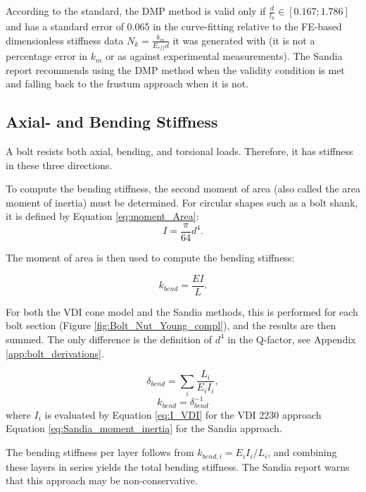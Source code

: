 \documentclass[a4paper,twoside]{bth}
\begin{document}
According to the standard, the DMP method is valid only if $\tfrac{d}{l_k} \in [0.167; 1.786]$ and has a standard error of 0.065 in the curve-fitting relative to the FE-based dimensionless stiffness data $N_k = \tfrac{k_m}{E_{eff}d}$ it was generated with (it is not a percentage error in $k_m$ or as against experimental measurements). The Sandia report recommends using the DMP method when the validity condition is met and falling back to the frustum approach when it is not.

\subsection{Axial- and Bending Stiffness}
A bolt resists both axial, bending, and torsional loads. Therefore, it has stiffness in these three directions.

To compute the bending stiffness, the second moment of area (also called the area moment of inertia) must be determined. For circular shapes such as a bolt shank, it is defined by Equation \ref{eq:moment_Area}:
\begin{equation} \label{eq:moment_Area}
    I = \frac{\pi}{64} d^4.
\end{equation}

The moment of area is then used to compute the bending stiffness:

\begin{equation}
    k_{bend} = \frac{EI}{L}.
\end{equation}

For both the VDI cone model and the Sandia methods, this is performed for each bolt section (Figure \ref{fig:Bolt_Nut_Young_compl}), and the results are then summed. The only difference is the definition of $d^4$ in the Q-factor, see Appendix \ref{app:bolt_derivations}.

\begin{equation}
    \delta_{bend} = \sum_i \frac{L_i}{E_i I_i},
\end{equation}
\begin{equation}
    k_{bend} = \delta_{bend}^{-1}
\end{equation}
where $I_i$ is evaluated by Equation \ref{eq:I_VDI} for the VDI 2230 approach Equation \ref{eq:Sandia_moment_inertia} for the Sandia approach.

The bending stiffness per layer follows from $k_{bend, i} = E_iI_i/L_i$, and combining these layers in series yields the total bending stiffness. The Sandia report warns that this approach may be non-conservative.
\end{document}
